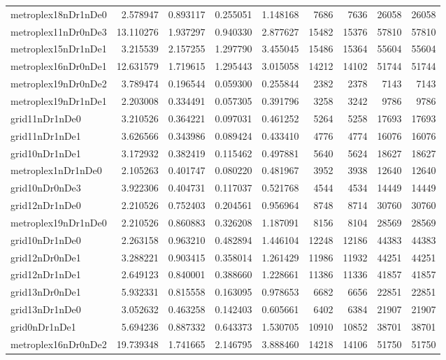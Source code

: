 \begin{longtable}{|l|r|r|r|r|r|r|r|r|}
metroplex18nDr1nDe0 & 2.578947 & 0.893117 & 0.255051 & 1.148168 & 7686 & 7636 & 26058 & 26058 \\
metroplex11nDr0nDe3 & 13.110276 & 1.937297 & 0.940330 & 2.877627 & 15482 & 15376 & 57810 & 57810 \\
metroplex15nDr1nDe1 & 3.215539 & 2.157255 & 1.297790 & 3.455045 & 15486 & 15364 & 55604 & 55604 \\
metroplex16nDr0nDe1 & 12.631579 & 1.719615 & 1.295443 & 3.015058 & 14212 & 14102 & 51744 & 51744 \\
metroplex19nDr0nDe2 & 3.789474 & 0.196544 & 0.059300 & 0.255844 & 2382 & 2378 & 7143 & 7143 \\
metroplex19nDr1nDe1 & 2.203008 & 0.334491 & 0.057305 & 0.391796 & 3258 & 3242 & 9786 & 9786 \\
grid11nDr1nDe0 & 3.210526 & 0.364221 & 0.097031 & 0.461252 & 5264 & 5258 & 17693 & 17693 \\
grid11nDr1nDe1 & 3.626566 & 0.343986 & 0.089424 & 0.433410 & 4776 & 4774 & 16076 & 16076 \\
grid10nDr1nDe1 & 3.172932 & 0.382419 & 0.115462 & 0.497881 & 5640 & 5624 & 18627 & 18627 \\
metroplex1nDr1nDe0 & 2.105263 & 0.401747 & 0.080220 & 0.481967 & 3952 & 3938 & 12640 & 12640 \\
grid10nDr0nDe3 & 3.922306 & 0.404731 & 0.117037 & 0.521768 & 4544 & 4534 & 14449 & 14449 \\
grid12nDr1nDe0 & 2.210526 & 0.752403 & 0.204561 & 0.956964 & 8748 & 8714 & 30760 & 30760 \\
metroplex19nDr1nDe0 & 2.210526 & 0.860883 & 0.326208 & 1.187091 & 8156 & 8104 & 28569 & 28569 \\
grid10nDr1nDe0 & 2.263158 & 0.963210 & 0.482894 & 1.446104 & 12248 & 12186 & 44383 & 44383 \\
grid12nDr0nDe1 & 3.288221 & 0.903415 & 0.358014 & 1.261429 & 11986 & 11932 & 44251 & 44251 \\
grid12nDr1nDe1 & 2.649123 & 0.840001 & 0.388660 & 1.228661 & 11386 & 11336 & 41857 & 41857 \\
grid13nDr0nDe1 & 5.932331 & 0.815558 & 0.163095 & 0.978653 & 6682 & 6656 & 22851 & 22851 \\
grid13nDr1nDe0 & 3.052632 & 0.463258 & 0.142403 & 0.605661 & 6402 & 6384 & 21907 & 21907 \\
grid0nDr1nDe1 & 5.694236 & 0.887332 & 0.643373 & 1.530705 & 10910 & 10852 & 38701 & 38701 \\
metroplex16nDr0nDe2 & 19.739348 & 1.741665 & 2.146795 & 3.888460 & 14218 & 14106 & 51750 & 51750 \\

\end{longtable}
